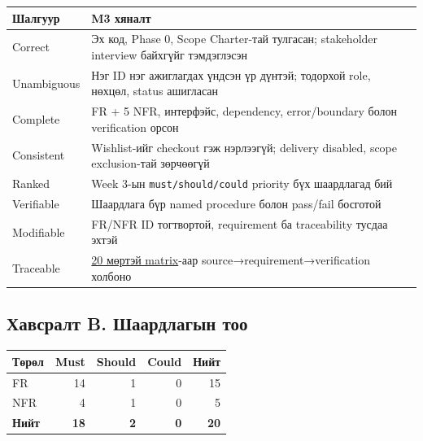 \documentclass[
  mongolian,
]{article}
\begin{document}
\begin{longtable}[]{@{}
  >{\raggedright\arraybackslash}p{}
  >{\raggedright\arraybackslash}p{}@{}}
\toprule\noalign{}
\begin{minipage}[b]{\linewidth}\raggedright
Шалгуур
\end{minipage} & \begin{minipage}[b]{\linewidth}\raggedright
M3 хяналт
\end{minipage} \\
\midrule\noalign{}
\endhead
\bottomrule\noalign{}
\endlastfoot
Correct & Эх код, Phase 0, Scope Charter-тай тулгасан; stakeholder
interview байхгүйг тэмдэглэсэн \\
Unambiguous & Нэг ID нэг ажиглагдах үндсэн үр дүнтэй; тодорхой role,
нөхцөл, status ашигласан \\
Complete & 15 FR + 5 NFR, интерфэйс, dependency, error/boundary болон
verification орсон \\
Consistent & Wishlist-ийг checkout гэж нэрлээгүй; delivery disabled,
scope exclusion-тай зөрчөөгүй \\
Ranked & Week 3-ын \texttt{must/should/could} priority бүх шаардлагад
бий \\
Verifiable & Шаардлага бүр named procedure болон pass/fail босготой \\
Modifiable & FR/NFR ID тогтвортой, requirement ба traceability тусдаа
эхтэй \\
Traceable & \href{traceability-matrix-v1.0.md}{20 мөртэй matrix}-аар
source→requirement→verification холбоно \\
\end{longtable}

\subsection{Хавсралт B. Шаардлагын
тоо}\label{ux445ux430ux432ux441ux440ux430ux43bux442-b.-ux448ux430ux430ux440ux434ux43bux430ux433ux44bux43d-ux442ux43eux43e}

\begin{longtable}[]{@{}lrrrr@{}}
\toprule\noalign{}
Төрөл & Must & Should & Could & Нийт \\
\midrule\noalign{}
\endhead
\bottomrule\noalign{}
\endlastfoot
FR & 14 & 1 & 0 & 15 \\
NFR & 4 & 1 & 0 & 5 \\
\textbf{Нийт} & \textbf{18} & \textbf{2} & \textbf{0} & \textbf{20} \\
\end{longtable}
\end{document}

